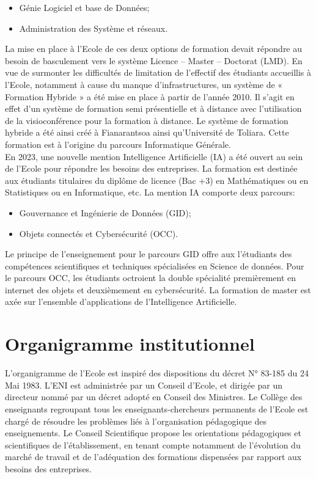 \documentclass[12pt]{report}
\begin{document}
						\begin{itemize}
							\item Génie Logiciel et base de Données;
							\item Administration des Système et réseaux.
						\end{itemize}
				
				La mise en place à l’Ecole de ces deux options de formation devait répondre au besoin de basculement vers le système Licence – Master – Doctorat (LMD). 
En vue de surmonter les difficultés de limitation de l’effectif des étudiants accueillis à l’Ecole, notamment à cause du manque d’infrastructures, un système de « Formation Hybride » a été mise en place à partir de l’année 2010. Il s’agit en effet d’un système de formation semi présentielle et à distance avec l’utilisation de la visioconférence pour la formation à distance. Le système de formation hybride a été ainsi créé à Fianarantsoa ainsi qu’Université de Toliara. Cette formation est à l’origine du parcours Informatique Générale.\\

				En 2023, une nouvelle mention Intelligence Artificielle (IA) a été ouvert au sein de l’Ecole pour répondre les besoins des entreprises. La formation est destinée aux étudiants titulaires du diplôme de licence (Bac +3) en Mathématiques ou en Statistiques ou en Informatique, etc. La mention IA comporte deux parcours:

						\begin{itemize}
							\item Gouvernance et Ingénierie de Données (GID);
							\item Objets connectés et Cybersécurité (OCC).
						\end{itemize}

				Le principe de l’enseignement pour le parcours GID offre aux l’étudiants des compétences scientifiques et techniques spécialisées en Science de données. Pour le parcours OCC, les étudiants octroient la double spécialité premièrement en internet des objets et deuxièmement en cybersécurité. La formation de master est axée sur l’ensemble d’applications de l’Intelligence Artificielle.

				\section{Organigramme institutionnel}

				\hspace{15pt} L’organigramme de l’Ecole est inspiré des dispositions du décret N° 83-185 du 24 Mai 1983. L’ENI est administrée par un Conseil d’Ecole, et dirigée par un directeur nommé par un décret adopté en Conseil des Ministres. Le Collège des enseignants regroupant tous les enseignants-chercheurs permanents de l’Ecole est chargé de résoudre les problèmes liés à l’organisation pédagogique des enseignements. Le Conseil Scientifique propose les orientations pédagogiques et scientifiques de l’établissement, en tenant compte notamment de l’évolution du marché de travail et de l’adéquation des formations dispensées par rapport aux besoins des entreprises. \\
\end{document}
